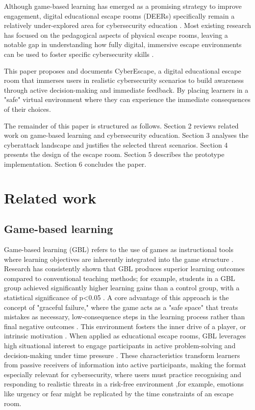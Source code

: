 \documentclass[sigconf, authorversion=true, nonacm=true]{acmart}%
\begin{document}
Although game-based learning has emerged as a promising strategy to improve engagement, digital educational escape rooms (DEERs) specifically remain a relatively under-explored area for cybersecurity education \cite{keller_digital_2025}. Most existing research has focused on the pedagogical aspects of physical escape rooms, leaving a notable gap in understanding how fully digital, immersive escape environments can be used to foster specific cybersecurity skills \cite{makri_digital_2021}.


This paper proposes and documents CyberEscape, a digital educational escape room that immerses users in realistic cybersecurity scenarios to build awareness through active decision-making and immediate feedback. By placing learners in a "safe" virtual environment where they can experience the immediate consequences of their choices.


The remainder of this paper is structured as follows. Section 2 reviews related work on game-based learning and cybersecurity education. Section 3 analyses the cyberattack landscape and justifies the selected threat scenarios. Section 4 presents the design of the escape room. Section 5 describes the prototype implementation. Section 6 concludes the paper.

\section{Related work}

\subsection{Game-based learning}

Game-based learning (GBL) refers to the use of games as instructional tools where learning objectives are inherently integrated into the game structure \cite{keller_digital_2025, plass_handbook_2020, plass_foundations_2015}. Research has consistently shown that GBL produces superior learning outcomes compared to conventional teaching methods; for example, students in a GBL group achieved significantly higher learning gains than a control group, with a statistical significance of p<0.05 \cite{wardoyo_effectiveness_2020}. A core advantage of this approach is the concept of "graceful failure," where the game acts as a "safe space" that treats mistakes as necessary, low-consequence steps in the learning process rather than final negative outcomes \cite{keller_digital_2025, plass_handbook_2020, plass_foundations_2015}. This environment fosters the inner drive of a player, or intrinsic motivation \cite{plass_handbook_2020, plass_foundations_2015}. When applied as educational escape rooms, GBL leverages high situational interest to engage participants in active problem-solving and decision-making under time pressure \cite{makri_digital_2021}. These characteristics transform learners from passive receivers of information into active participants, making the format especially relevant for cybersecurity, where users must practice recognising and responding to realistic threats in a risk-free environment \cite{makri_digital_2021},for example, emotions like urgency or fear might be replicated by the time constraints of an escape room.
\end{document}
